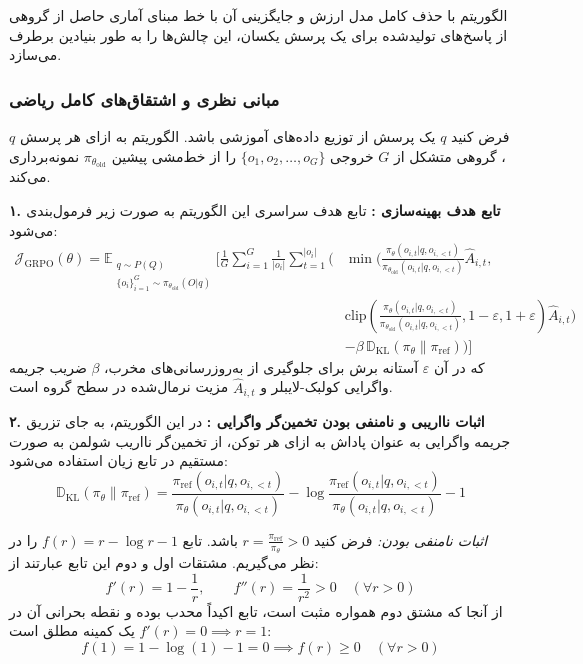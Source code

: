الگوریتم  با حذف کامل مدل ارزش و جایگزینی آن با خط مبنای آماری حاصل از گروهی از پاسخ‌های تولیدشده برای یک پرسش یکسان، این چالش‌ها را به طور بنیادین برطرف می‌سازد.

\subsubsection*{مبانی نظری و اشتقاق‌های کامل ریاضی}

فرض کنید $q$ یک پرسش از توزیع داده‌های آموزشی باشد. الگوریتم  به ازای هر پرسش $q$، گروهی متشکل از $G$ خروجی $\{o_1, o_2, \dots, o_G\}$ را از خط‌مشی پیشین $\pi_{\theta_{\text{old}}}$ نمونه‌برداری می‌کند.

\textbf{۱. تابع هدف بهینه‌سازی :}
تابع هدف سراسری این الگوریتم به صورت زیر فرمول‌بندی می‌شود:
\begin{align}
	\mathcal{J}_{\text{GRPO}}(\theta) = \mathbb{E}_{\substack{q \sim P(Q) \\ \{o_i\}_{i=1}^G \sim \pi_{\theta_{\text{old}}}(O|q)}} \Bigg[ \frac{1}{G} \sum_{i=1}^G \frac{1}{|o_i|} \sum_{t=1}^{|o_i|} \Bigg( &\min \Bigg( \frac{\pi_\theta(o_{i,t}|q, o_{i,<t})}{\pi_{\theta_{\text{old}}}(o_{i,t}|q, o_{i,<t})} \hat{A}_{i,t}, \nonumber \\
	&\text{clip}\left(\frac{\pi_\theta(o_{i,t}|q, o_{i,<t})}{\pi_{\theta_{\text{old}}}(o_{i,t}|q, o_{i,<t})}, 1-\varepsilon, 1+\varepsilon\right) \hat{A}_{i,t} \Bigg) \nonumber \\
	&- \beta \, \mathbb{D}_{\text{KL}}\left(\pi_\theta \parallel \pi_{\text{ref}}\right) \Bigg) \Bigg]
\end{align}
که در آن $\varepsilon$ آستانه برش برای جلوگیری از به‌روزرسانی‌های مخرب، $\beta$ ضریب جریمه واگرایی کولبک-لایبلر و $\hat{A}_{i,t}$ مزیت نرمال‌شده در سطح گروه است.

\textbf{۲. اثبات نااریبی و نامنفی بودن تخمین‌گر واگرایی :}
در این الگوریتم، به جای تزریق جریمه واگرایی به عنوان پاداش به ازای هر توکن، از تخمین‌گر نااریب شولمن \cite{schulman2020approximating} به صورت مستقیم در تابع زیان استفاده می‌شود:
\begin{equation}
	\mathbb{D}_{\text{KL}}(\pi_\theta \parallel \pi_{\text{ref}}) = \frac{\pi_{\text{ref}}(o_{i,t}|q, o_{i,<t})}{\pi_\theta(o_{i,t}|q, o_{i,<t})} - \log \frac{\pi_{\text{ref}}(o_{i,t}|q, o_{i,<t})}{\pi_\theta(o_{i,t}|q, o_{i,<t})} - 1
\end{equation}

\textit{اثبات نامنفی بودن:} فرض کنید $r = \frac{\pi_{\text{ref}}}{\pi_\theta} > 0$ باشد. تابع $f(r) = r - \log r - 1$ را در نظر می‌گیریم. مشتقات اول و دوم این تابع عبارتند از:
\begin{equation}
	f'(r) = 1 - \frac{1}{r}, \qquad f''(r) = \frac{1}{r^2} > 0 \quad (\forall r > 0)
\end{equation}
از آنجا که مشتق دوم همواره مثبت است، تابع اکیداً محدب بوده و نقطه بحرانی آن در $f'(r) = 0 \implies r = 1$ یک کمینه مطلق است:
\begin{equation}
	f(1) = 1 - \log(1) - 1 = 0 \implies f(r) \ge 0 \quad (\forall r > 0)
\end{equation}


